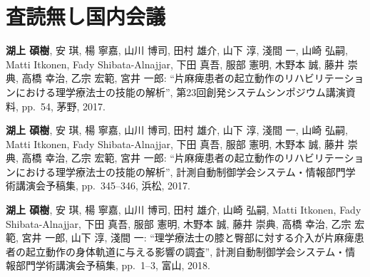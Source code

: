 \clearpage

\section*{査読無し国内会議}

\mbox{}
\begin{enumerate}[{[}1{]}]
\item \textbf{湖上 碩樹}, 安 琪, 楊 寧嘉, 山川 博司, 田村 雄介, 山下 淳, 淺間 一, 山崎 弘嗣, Matti Itkonen, Fady Shibata-Alnajjar, 下田 真吾, 服部 憲明, 木野本 誠, 藤井 崇典, 高橋 幸治, 乙宗 宏範, 宮井 一郎: ``片麻痺患者の起立動作のリハビリテーションにおける理学療法士の技能の解析'', 第23回創発システムシンポジウム講演資料, pp.~54, 茅野, 2017.

\item \textbf{湖上 碩樹}, 安 琪, 楊 寧嘉, 山川 博司, 田村 雄介, 山下 淳, 淺間 一, 山崎 弘嗣, Matti Itkonen, Fady Shibata-Alnajjar, 下田 真吾, 服部 憲明, 木野本 誠, 藤井 崇典, 高橋 幸治, 乙宗 宏範, 宮井 一郎: ``片麻痺患者の起立動作のリハビリテーションにおける理学療法士の技能の解析'', 計測自動制御学会システム・情報部門学術講演会予稿集, pp.~345--346, 浜松, 2017.

\item \textbf{湖上 碩樹}, 安 琪, 楊 寧嘉, 山川 博司, 田村 雄介, 山崎 弘嗣, Matti Itkonen, Fady Shibata-Alnajjar, 下田 真吾, 服部 憲明, 木野本 誠, 藤井 崇典, 高橋 幸治, 乙宗 宏範, 宮井 一郎, 山下 淳, 淺間 一: ``理学療法士の膝と臀部に対する介入が片麻痺患者の起立動作の身体軌道に与える影響の調査'', 計測自動制御学会システム・情報部門学術講演会予稿集, pp.~1--3, 富山, 2018.


\end{enumerate}


